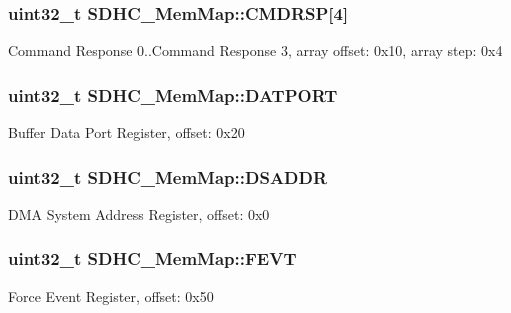 \subsubsection[{C\+M\+D\+R\+S\+P}]{\setlength{\rightskip}{0pt plus 5cm}uint32\+\_\+t S\+D\+H\+C\+\_\+\+Mem\+Map\+::\+C\+M\+D\+R\+S\+P\mbox{[}4\mbox{]}}\label{struct_s_d_h_c___mem_map_ad68e1706e76585042d163c6798c0f545}
Command Response 0..Command Response 3, array offset\+: 0x10, array step\+: 0x4 \hypertarget{struct_s_d_h_c___mem_map_a35328e0ac868a1173f45025dfe9d064a}{}
\subsubsection[{D\+A\+T\+P\+O\+R\+T}]{\setlength{\rightskip}{0pt plus 5cm}uint32\+\_\+t S\+D\+H\+C\+\_\+\+Mem\+Map\+::\+D\+A\+T\+P\+O\+R\+T}\label{struct_s_d_h_c___mem_map_a35328e0ac868a1173f45025dfe9d064a}
Buffer Data Port Register, offset\+: 0x20 \hypertarget{struct_s_d_h_c___mem_map_ab31a362061944d6279ddb9477319dadf}{}
\subsubsection[{D\+S\+A\+D\+D\+R}]{\setlength{\rightskip}{0pt plus 5cm}uint32\+\_\+t S\+D\+H\+C\+\_\+\+Mem\+Map\+::\+D\+S\+A\+D\+D\+R}\label{struct_s_d_h_c___mem_map_ab31a362061944d6279ddb9477319dadf}
D\+M\+A System Address Register, offset\+: 0x0 \hypertarget{struct_s_d_h_c___mem_map_a6a098ed78e71b25e706ddcc64960aae7}{}
\subsubsection[{F\+E\+V\+T}]{\setlength{\rightskip}{0pt plus 5cm}uint32\+\_\+t S\+D\+H\+C\+\_\+\+Mem\+Map\+::\+F\+E\+V\+T}\label{struct_s_d_h_c___mem_map_a6a098ed78e71b25e706ddcc64960aae7}
Force Event Register, offset\+: 0x50 \hypertarget{struct_s_d_h_c___mem_map_a27ec00dc3be305a561fae9978fe799a2}{}
